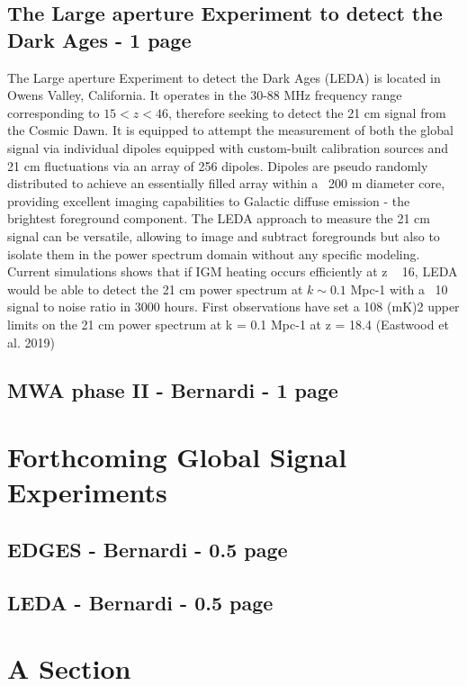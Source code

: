 \subsection{The Large aperture Experiment to detect the Dark Ages - 1 page}
The Large aperture Experiment to detect the Dark Ages (LEDA) is located in Owens Valley, California. It operates in the 30-88 MHz frequency range corresponding to $15 < z < 46$, therefore seeking to detect the 21 cm signal from the Cosmic Dawn. It is equipped to attempt the measurement of both the global signal via individual dipoles equipped with custom-built calibration sources and 21 cm fluctuations via an array of 256 dipoles. Dipoles are pseudo randomly distributed to achieve an essentially filled array within a ~200 m diameter core, providing excellent imaging capabilities to Galactic diffuse emission - the brightest foreground component. The LEDA approach to measure the 21 cm signal can be versatile, allowing to image and subtract foregrounds but also to isolate them in the power spectrum domain without any specific modeling. Current simulations shows that if IGM heating occurs efficiently at z ~ 16, LEDA would be able to detect the 21 cm power spectrum at $k \sim 0.1$ Mpc-1 with a ~10 signal to noise ratio in 3000 hours. First observations have set a 108 (mK)2 upper limits on the 21 cm power spectrum at k = 0.1 Mpc-1 at z = 18.4 (Eastwood et al. 2019)


\subsection{MWA phase II - Bernardi - 1 page}





\section{Forthcoming Global Signal Experiments}

\subsection{EDGES - Bernardi - 0.5 page}

\subsection{LEDA - Bernardi - 0.5 page}




\section{A Section}

